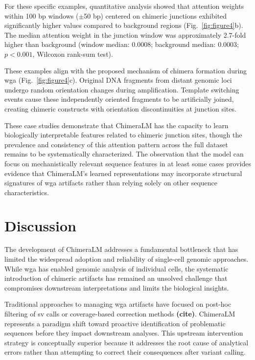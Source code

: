 \documentclass[pdflatex,sn-nature]{sn-jnl}%
\theoremstyle{thmstyleone}%
\theoremstyle{thmstyletwo}%
\theoremstyle{thmstylethree}%
\begin{document}
For these specific examples, quantitative analysis showed that attention weights within 100 bp windows ($\pm$50 bp) centered on chimeric junctions exhibited significantly higher values compared to background regions (Fig.~\ref{fig:figure4}b).
The median attention weight in the junction window was approximately 2.7-fold higher than background (window median: 0.0008; background median: 0.0003; $p < 0.001$, Wilcoxon rank-sum test).

These examples align with the proposed mechanism of chimera formation during \gls{wga} (Fig.~\ref{fig:figure4}c).
Original DNA fragments from distant genomic loci undergo random orientation changes during amplification.
Template switching events cause these independently oriented fragments to be artificially joined, creating chimeric constructs with orientation discontinuities at junction sites.

These case studies demonstrate that ChimeraLM has the capacity to learn biologically interpretable features related to chimeric junction sites, though the prevalence and consistency of this attention pattern across the full dataset remains to be systematically characterized.
The observation that the model can focus on mechanistically relevant sequence features in at least some cases provides evidence that ChimeraLM's learned representations may incorporate structural signatures of \gls{wga} artifacts rather than relying solely on other sequence characteristics.

\section*{Discussion}
The development of ChimeraLM addresses a fundamental bottleneck that has limited the widespread adoption and reliability of single-cell genomic approaches.
While \gls{wga} has enabled genomic analysis of individual cells, the systematic introduction of chimeric artifacts has remained an unsolved challenge that compromises downstream interpretations and limits the biological insights.

Traditional approaches to managing \gls{wga} artifacts have focused on post-hoc filtering of \gls{sv} calls or coverage-based correction methods \textbf{(cite)}.
ChimeraLM represents a paradigm shift toward proactive identification of problematic sequences before they impact downstream analyses.
This upstream intervention strategy is conceptually superior because it addresses the root cause of analytical errors rather than attempting to correct their consequences after variant calling.
\end{document}
